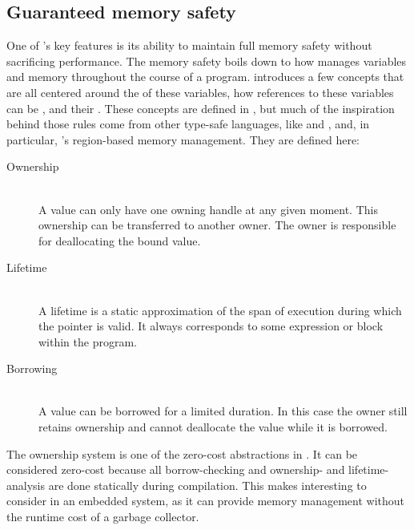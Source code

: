 \subsection{Guaranteed memory safety}
\label{sec:guaranteed_memory_safety}

One of {\rust}'s key features is its ability to maintain full memory safety without sacrificing performance.
The memory safety boils down to how {\rust} manages variables and memory throughout the course of a program.
{\rust} introduces a few concepts that are all centered around the  of these variables, how references to these variables can be , and their .
These concepts are defined in {\rust}, but much of the inspiration behind those rules come from other type-safe languages, like {} and {}, and, in particular, {}'s \cite{Grossman2002,Swamy2006} region-based memory management.
They are defined here:

\begin{description}
\item [Ownership] \hfill \\
  A value can only have one owning handle at any given moment.
  This ownership can be transferred to another owner.
  The owner is responsible for deallocating the bound value.

\item [Lifetime] \hfill \\
  A lifetime is a static approximation of the span of execution during which the pointer is valid.
  It always corresponds to some expression or block within the program.

\item [Borrowing] \hfill \\
  A value can be borrowed for a limited duration.
  In this case the owner still retains ownership and cannot deallocate the value while it is borrowed.

\end{description}

The ownership system is one of the zero-cost abstractions in {\rust}.
It can be considered zero-cost because all borrow-checking and ownership- and lifetime-analysis are done statically during compilation.
This makes {\rust} interesting to consider in an embedded system, as it can provide memory management without the runtime cost of a garbage collector.



